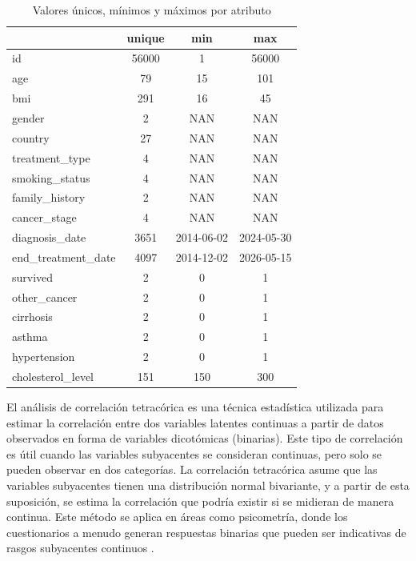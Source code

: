 \documentclass[10pt,journal,compsoc]{IEEEtran}
\begin{document}
\begin{table}[h!]
\centering
\begin{tabular}{|l|c|c|c|}
\hline
                        & \textbf{unique}   & \textbf{min}  & \textbf{max} \\ \hline
id                      &  56000        & 1             & 56000     \\ \hline
age                     &  79           & 15            & 101       \\ \hline
bmi                     &  291          & 16            & 45        \\ \hline
gender                  &  2            & NAN           & NAN       \\ \hline
country                 &  27           & NAN           & NAN       \\ \hline
treatment\_type         &  4            & NAN           & NAN \\ \hline
smoking\_status         &  4            & NAN           & NAN \\ \hline
family\_history         &  2            & NAN           & NAN \\ \hline
cancer\_stage           &  4            & NAN           &  NAN\\ \hline
diagnosis\_date         & 3651          & 2014-06-02    & 2024-05-30\\ \hline
end\_treatment\_date    &  4097         & 2014-12-02    & 2026-05-15 \\ \hline
survived                &  2            &  0            & 1\\ \hline
other\_cancer           &  2            & 0             & 1 \\ \hline
cirrhosis               &  2            & 0             & 1 \\ \hline
asthma                  &  2            & 0             & 1 \\ \hline
hypertension            &  2            & 0             & 1 \\ \hline
cholesterol\_level      &  151          & 150           & 300 \\ \hline
\end{tabular}
\caption{Valores únicos, mínimos y máximos por atributo}
\label{tab:valoresUnicos}
\end{table}
El análisis de correlación tetracórica es una técnica estadística utilizada para estimar la correlación entre dos variables latentes continuas a partir de datos observados en forma de variables dicotómicas (binarias). Este tipo de correlación es útil cuando las variables subyacentes se consideran continuas, pero solo se pueden observar en dos categorías. La correlación tetracórica asume que las variables subyacentes tienen una distribución normal bivariante, y a partir de esta suposición, se estima la correlación que podría existir si se midieran de manera continua. Este método se aplica en áreas como psicometría, donde los cuestionarios a menudo generan respuestas binarias que pueden ser indicativas de rasgos subyacentes continuos \cite{olsson1979maximum}.
\end{document}
